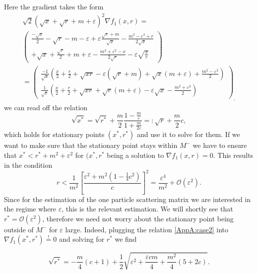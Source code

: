 \documentclass[b5paper,draft,openbib,12pt]{memoir}
\begin{document}
\begin{enumerate}[label=case \alph*),]
Here the gradient takes the form
\begin{multline*}
\sqrt{2}(\sqrt{x}+\sqrt{r}+m+\varepsilon)^2 \nabla f_1(x,r)= \\
\begin{pmatrix}
\frac{-\sqrt{x}}{2} -\sqrt{r}-m-\varepsilon+\varepsilon\frac{\sqrt{r}+ m}{\sqrt{x}}-\frac{m^2-\varepsilon^2+r}{2\sqrt{x}}\\
+\sqrt{x}+\frac{\sqrt{r}}{2}+m+\varepsilon -\frac{m^2+\varepsilon^2 -x}{2\sqrt{r}}-\varepsilon\sqrt{\frac{x}{r}}
\end{pmatrix}\\
=\begin{pmatrix}
\frac{-1}{\sqrt{x}} \left(\frac{x}{2}+\frac{r}{2} +\sqrt{x r}-\varepsilon (\sqrt{r}+ m)+\sqrt{x}(m+\varepsilon)+\frac{m^2-\varepsilon^2}{2}\right)\\
\frac{1}{\sqrt{r}}\left(\frac{x}{2}+\frac{r}{2}+\sqrt{xr}+\sqrt{r}(m+\varepsilon) -\varepsilon\sqrt{x}-\frac{m^2+\varepsilon^2 }{2}\right)
\end{pmatrix}_,
\end{multline*}
we can read off the relation 
\begin{equation}\label{AppA:case2}
\sqrt{x^*}=\sqrt{r^*}+\frac{m}{2}\frac{1-\frac{m}{\varepsilon}}{1+\frac{m}{2\varepsilon}}=:\sqrt{r}+\frac{m}{2} c,
\end{equation}
 which holds for stationary points \((x^*,r^*)\)  and use it to solve for them.
  If we want to make sure that the stationary point stays within \(M^-\) we have to ensure
  that \(x^*<r^*+m^2+\varepsilon^2\) for \((x^*,r^*\) being a solution to \(\nabla f_1(x,r)=0\).
This results in the condition
\begin{equation*}
r< \frac{1}{m^2}\left[ \frac{\varepsilon^2+m^2(1-\frac{1}{4}c^2)}{c}\right]^2=\frac{\varepsilon^4}{m^2}+ \mathcal{O}(\varepsilon^2).
\end{equation*}
Since for the estimation of the one particle scattering matrix we are interested in the 
 regime where \(\varepsilon\), this is the relevant estimation. We will shortly see that 
 \(r^*=\mathcal{O}(\varepsilon^2)\), therefore we need not worry about the stationary point
 being outside of \(M^-\) for \(\varepsilon\) large. Indeed, plugging the relation
  \eqref{AppA:case2} into \(\nabla f_1(x^*,r^*) \stackrel{!}{=}0\) and solving for \(r^*\) we find
  
\begin{equation*}
\sqrt{r^*}=-\frac{m}{4}(c+1) +\frac{1}{2} \sqrt{\varepsilon^2 + \frac{\varepsilon c m}{4} + \frac{m^2}{4}(5+2c)}.
\end{equation*}


\end{enumerate}
\end{document}
